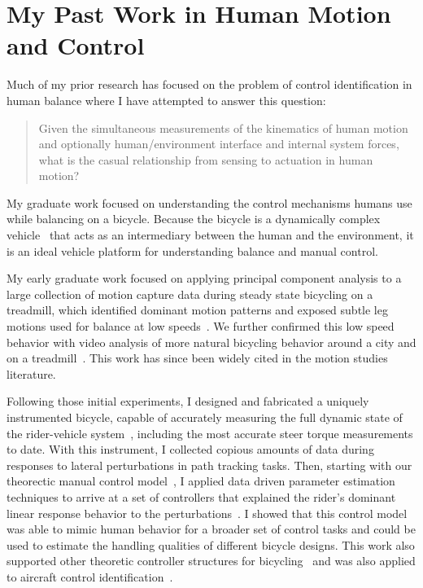 \documentclass{article}
\begin{document}
\section*{My Past Work in Human Motion and Control}
%
Much of my prior research has focused on the problem of control identification
in human balance where I have attempted to answer this question:

\begin{quote}
  Given the simultaneous measurements of the kinematics of human motion and
  optionally human/environment interface and internal system forces, what is
  the casual relationship from sensing to actuation in human motion?
\end{quote}

My graduate work focused on understanding the control mechanisms humans use
while balancing on a bicycle. Because the bicycle is a dynamically complex
vehicle~\cite{Astrom2005,Meijaard2007,Moore2007,Moore2008} that acts as an
intermediary between the human and the environment, it is an ideal vehicle
platform for understanding balance and manual control.

My early graduate work focused on applying principal component analysis to a
large collection of motion capture data during steady state bicycling on a
treadmill, which identified dominant motion patterns and exposed subtle leg
motions used for balance at low speeds~\cite{Moore2009a,Moore2011c}. We further
confirmed this low speed behavior with video analysis of more natural bicycling
behavior around a city and on a treadmill~\cite{Kooijman2009}. This work has
since been widely cited in the motion studies literature.

Following those initial experiments, I designed and fabricated a uniquely
instrumented bicycle, capable of accurately measuring the full dynamic state of
the rider-vehicle system~\cite{Moore2012,Moore2013}, including the most
accurate steer torque measurements to date. With this instrument, I collected
copious amounts of data during responses to lateral perturbations in path
tracking tasks. Then, starting with our theorectic manual control
model~\cite{Hess2012}, I applied data driven parameter estimation techniques to
arrive at a set of controllers that explained the rider's dominant linear
response behavior to the perturbations~\cite{Moore2012}. I showed that this
control model was able to mimic human behavior for a broader set of control
tasks and could be used to estimate the handling qualities of different bicycle
designs. This work also supported other theoretic controller structures for
bicycling~\cite{Schwab2012a,Schwab2012,Schwab2013} and was also applied to
aircraft control identification~\cite{Hess2013}.
\end{document}
